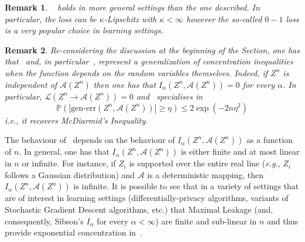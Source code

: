 \documentclass{article}
\numberwithin{theorem}{section}
\numberwithin{example}{section}
\newtheorem{remark}{Remark}
\numberwithin{remark}{section}
\numberwithin{definition}{section}
\newcommand{\ml}[2]{\mathcal{L}\left(#1  \!\!  \to  \!\!   #2\right)} %
\begin{document}
\begin{remark}
    ~ holds in more general settings than the one described. In particular, the loss can be $\kappa$-Lipschitz with $\kappa<\infty$ however the so-called $0-1$ loss is a very popular choice in learning settings.
\end{remark}
\begin{remark}
    Re-considering the discussion at the beginning of the Section, one has that~ and, in particular~,  represent a generalization of concentration inequalities when the function depends on the random variables themselves. Indeed, if $Z^n$ is independent of $\mathcal{A}(Z^n)$ then one has that $I_\alpha(Z^n,\mathcal{A}(Z^n))=0$ for every $\alpha$. In particular, $\ml{Z^n}{\mathcal{A}(Z^n)}=0$ and~ specialises in 
    \begin{equation}
       \mathbb{P}(|\text{gen-err}(Z^n,\mathcal{A}(Z^n))|\geq \eta)\leq 2\exp(-2n\eta^2) 
    \end{equation}
    \textit{i.e.}, it recovers McDiarmid's Inequality.
\end{remark}
The behaviour of~ depends on the behaviour of $I_\alpha(Z^n,\mathcal{A}(Z^n))$ as a function of $n$. In general, one has that $I_\alpha(Z^n,\mathcal{A}(Z^n))$ is either finite and at most linear in $n$ or infinite. 
For instance, if $Z_i$ is supported over the entire real line (\textit{e.g.}, $Z_i$ follows a Gaussian distribution) and $\mathcal{A}$ is a deterministic mapping, then $I_\alpha(Z^n,\mathcal{A}(Z^n))$ is infinite. 
It is possible to see that in a variety of settings that are of interest in learning settings (differentially-privacy algorithms, variants of Stochastic Gradient Descent algorithms, etc.) that Maximal Leakage (and, consequently, Sibson's $I_\alpha$ for every $\alpha<\infty$) are finite and sub-linear in $n$ and thus provide exponential concentration in~. 
\end{document}
